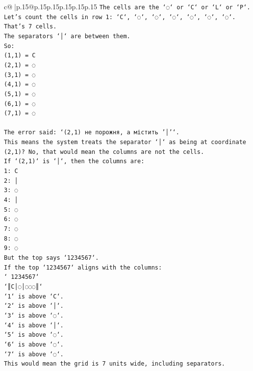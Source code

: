 \documentclass{article}
\begin{document}
{\begin{supertabular}{c@{$\;$}|p{.15\linewidth}@{}p{.15\linewidth}p{.15\linewidth}p{.15\linewidth}p{.15\linewidth}p{.15\linewidth}}
{{{\texttt{The cells are the `◌` or `C` or `L` or `P`.} \\
\texttt{Let's count the cells in row 1: `C`, `◌`, `◌`, `◌`, `◌`, `◌`, `◌`. That's 7 cells.} \\
\texttt{The separators `│` are between them.} \\
\texttt{So:} \\
\texttt{(1,1) = C} \\
\texttt{(2,1) = ◌} \\
\texttt{(3,1) = ◌} \\
\texttt{(4,1) = ◌} \\
\texttt{(5,1) = ◌} \\
\texttt{(6,1) = ◌} \\
\texttt{(7,1) = ◌} \\
\\ 
\texttt{The error said: `(2,1) не порожня, а містить '│'`.} \\
\texttt{This means the system treats the separator `│` as being at coordinate (2,1)? No, that would mean the columns are not the cells.} \\
\texttt{If `(2,1)` is `│`, then the columns are:} \\
\texttt{1: C} \\
\texttt{2: │} \\
\texttt{3: ◌} \\
\texttt{4: │} \\
\texttt{5: ◌} \\
\texttt{6: ◌} \\
\texttt{7: ◌} \\
\texttt{8: ◌} \\
\texttt{9: ◌} \\
\texttt{But the top says `1234567`.} \\
\texttt{If the top `1234567` aligns with the columns:} \\
\texttt{` 1234567`} \\
\texttt{`║C│◌│◌◌◌║`} \\
\texttt{`1` is above `C`.} \\
\texttt{`2` is above `│`.} \\
\texttt{`3` is above `◌`.} \\
\texttt{`4` is above `│`.} \\
\texttt{`5` is above `◌`.} \\
\texttt{`6` is above `◌`.} \\
\texttt{`7` is above `◌`.} \\
\texttt{This would mean the grid is 7 units wide, including separators.} \\
}}}
\end{supertabular}}
\end{document}
